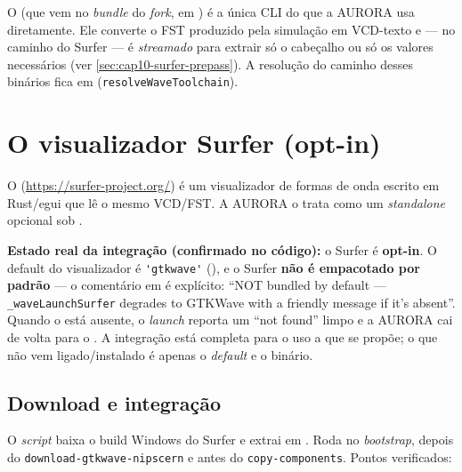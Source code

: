 O  (que vem no \emph{bundle} do \emph{fork}, em
) é a única CLI do
 que a AURORA usa diretamente. Ele converte o FST produzido pela
simulação em VCD-texto e — no caminho do Surfer — é \emph{streamado} para extrair só
o cabeçalho ou só os valores necessários (ver \autoref{sec:cap10-surfer-prepass}). A
resolução do caminho desses binários fica em
 (\lstinline|resolveWaveToolchain|).

\section{O visualizador Surfer (opt-in)}
\label{sec:cap10-surfer}

O  (\url{https://surfer-project.org/}) é um visualizador de formas de
onda escrito em Rust/egui que lê o mesmo VCD/FST. A AURORA o trata como um
 \emph{standalone} opcional sob .

\begin{nota}
\textbf{Estado real da integração (confirmado no código):} o Surfer é
\textbf{opt-in}. O default do visualizador é \lstinline|'gtkwave'|
(), e o Surfer \textbf{não é empacotado por padrão} — o
comentário em  é explícito: \enquote{NOT bundled by default
— \lstinline|_waveLaunchSurfer| degrades to GTKWave with a friendly message if it's
absent}. Quando o  está ausente, o \emph{launch} reporta um
\enquote{not found} limpo e a AURORA cai de volta para o . A integração
está completa para o uso a que se propõe; o que não vem ligado/instalado é apenas o
\emph{default} e o binário.
\end{nota}

\subsection{Download e integração}
\label{sec:cap10-surfer-download}

O \emph{script}  baixa o build Windows do
Surfer e extrai  em . Roda no
\emph{bootstrap}, depois do \texttt{download-gtkwave-nipscern} e antes do
\texttt{copy-components}. Pontos verificados:

